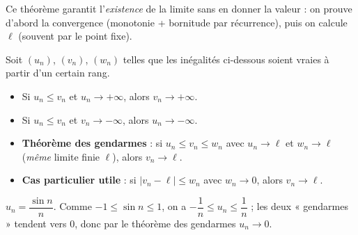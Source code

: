 \begin{remarque}
Ce théorème garantit l'\emph{existence} de la limite sans en donner la valeur : on prouve d'abord
la convergence (monotonie + bornitude par récurrence), puis on calcule $\ell$ (souvent par le point fixe).
\end{remarque}

\begin{illus}
\end{illus}

\begin{theoreme}
Soit $(u_n)$, $(v_n)$, $(w_n)$ telles que les inégalités ci-dessous soient vraies à partir d'un
certain rang.
\begin{itemize}
\item Si $u_n\le v_n$ et $u_n\to+\infty$, alors $v_n\to+\infty$.
\item Si $u_n\le v_n$ et $v_n\to-\infty$, alors $u_n\to-\infty$.
\item \textbf{Théorème des gendarmes} : si $u_n\le v_n\le w_n$ avec $u_n\to\ell$ et $w_n\to\ell$
  (\emph{même} limite finie $\ell$), alors $v_n\to\ell$.
\item \textbf{Cas particulier utile} : si $|v_n-\ell|\le w_n$ avec $w_n\to0$, alors $v_n\to\ell$.
\end{itemize}
\end{theoreme}

\begin{exemple}
$u_n=\dfrac{\sin n}{n}$. Comme $-1\le\sin n\le1$, on a $-\dfrac1n\le u_n\le\dfrac1n$ ;
les deux « gendarmes » tendent vers $0$, donc par le théorème des gendarmes $u_n\to0$.
\end{exemple}

